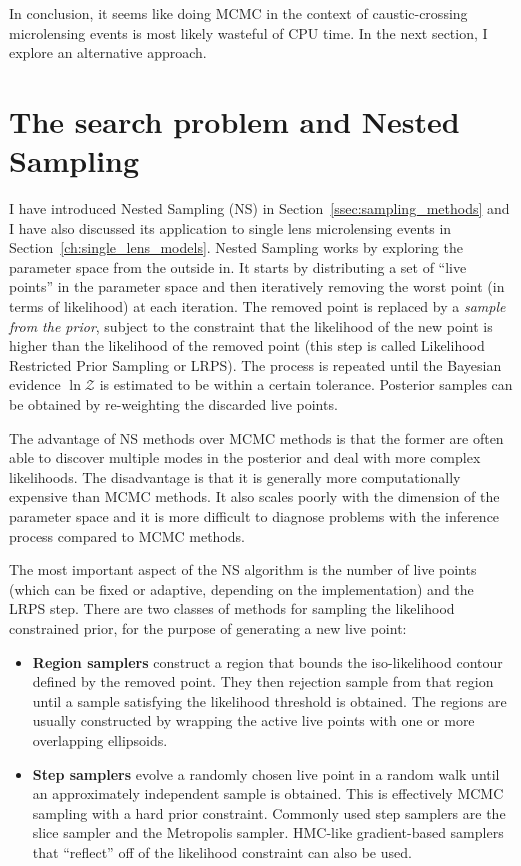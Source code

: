 \documentclass[12pt,dvipsnames]{report}
\begin{document}
In conclusion, it seems like doing MCMC in the context of caustic-crossing 
microlensing events is most likely wasteful of CPU time. 
In the next section, I explore an alternative approach.

\section{The search problem and Nested Sampling}
\label{sec:binary_lens_ns}
I have introduced Nested Sampling (NS) in Section~\ref{ssec:sampling_methods} and I have 
also discussed its application to single lens microlensing events in
Section~\ref{ch:single_lens_models}. Nested Sampling works by exploring the parameter space 
from the outside in. It starts by distributing a set of ``live points'' in the 
parameter space and then iteratively removing the worst point (in terms of likelihood)
at each iteration. The removed point is replaced by a \emph{sample from the prior}, 
subject to the constraint that the likelihood of the new point is higher than the 
likelihood of the removed point (this step is called Likelihood Restricted Prior 
Sampling or LRPS).
The process is repeated until the Bayesian evidence 
$\ln\mathcal{Z}$ is estimated to be within a certain tolerance. Posterior samples can be 
obtained by re-weighting the discarded live points. 

The advantage of NS methods 
over MCMC methods is that the former are often able to discover multiple modes in the 
posterior and deal with more complex likelihoods. The disadvantage is that it is generally
more computationally expensive than MCMC methods. 
It also scales poorly with the dimension of 
the parameter space and it is more difficult to diagnose problems with the inference process
compared to MCMC methods.

The most important aspect of the NS algorithm is the number of live points (which can be fixed
or adaptive, depending on the implementation) and the LRPS step. There are two classes of methods 
for sampling the likelihood constrained prior, for the purpose of generating a new live point:
\begin{itemize}
    \item \textbf{Region samplers} construct a region that bounds the iso-likelihood contour 
    defined by the removed point. They then rejection sample from that region until a sample 
    satisfying the likelihood threshold is obtained. The regions are usually constructed 
    by wrapping the active live points with one or more overlapping ellipsoids. 
    \item \textbf{Step samplers} evolve a randomly chosen live point in a random walk 
    until an approximately independent sample is obtained. This is effectively MCMC 
    sampling with a hard prior constraint. Commonly used step samplers are the slice sampler
    and the Metropolis sampler. HMC-like gradient-based samplers that 
    ``reflect'' off of the likelihood constraint can also be used.
\end{itemize}
\end{document}
